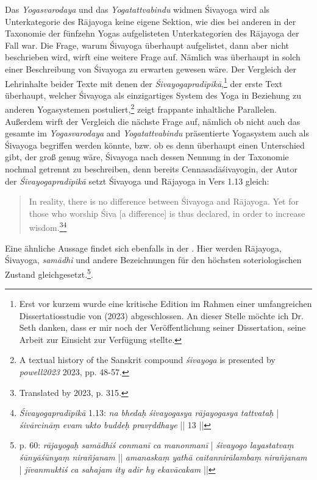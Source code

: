 Das \textit{Yogasvarodaya} und das \textit{Yogatattvabindu} widmen Śivayoga wird als Unterkategorie des Rājayoga keine eigene Sektion, wie dies bei anderen in der Taxonomie der fünfzehn Yogas aufgelisteten Unterkategorien des Rājayoga der Fall war. Die Frage, warum Śivayoga überhaupt aufgelistet, dann aber nicht beschrieben wird, wirft eine weitere Frage auf. Nämlich was überhaupt in solch einer Beschreibung von Śivayoga zu erwarten gewesen wäre. Der Vergleich der Lehrinhalte beider Texte mit denen der \textit{Śivayogapradīpikā},\footnote{Erst vor kurzem wurde eine kritische Edition im Rahmen einer umfangreichen Dissertatiosstudie von \citeauthor{powell2023} (2023) abgeschlossen. An dieser Stelle möchte ich Dr. Seth \citeauthor{powell2023} danken, dass er mir noch der Veröffentlichung seiner Dissertation, seine Arbeit zur Einsicht zur Verfügung stellte.} der erste Text überhaupt, welcher Śivayoga als einzigartiges System des Yoga in Beziehung zu anderen Yogasystemen postuliert,\footnote{A textual history of the Sanskrit compound \textit{śivayoga} is presented by \textit{powell2023} 2023, pp. 48-57.} zeigt frappante inhaltliche Parallelen. Außerdem wirft der Vergleich die nächste Frage auf, nämlich ob nicht auch das gesamte im \textit{Yogasvarodaya} and \textit{Yogatattvabindu} präsentierte Yogasystem auch als Śivayoga begriffen werden könnte, bzw. ob es denn überhaupt einen Unterschied gibt, der groß genug wäre, Śivayoga nach dessen Nennung in der Taxonomie nochmal getrennt zu beschreiben, denn bereits Cennasadāśivayogin, der Autor der \textit{Śivayogapradīpikā} setzt Śivayoga und Rājayoga in Vers 1.13 gleich:
\begin{quote}
In reality, there is no difference between Śivayoga and Rājayoga. Yet for those who worship Śiva [a difference] is thus declared, in order to increase wisdom.\footnote{Translated by \citeauthor{powell2023} 2023, p. 315.}\footnote{\textit{Śivayogapradīpikā} 1.13: \textit{na bhedaḥ śivayogasya rājayogasya tattvataḥ} | \textit{śivārcināṃ evam ukto buddeḥ pravṛddhaye} || 13 ||} 
\end{quote}
Eine ähnliche Aussage findet sich ebenfalls in der . Hier werden Rājayoga, Śivayoga, \textit{samādhi} und andere Bezeichnungen für den höchsten soteriologischen Zustand gleichgesetzt.\footnote{ p. 60: \textit{rājayogaḥ samādhiś conmanī ca manonmanī} | \textit{śivayogo layastatvaṃ śūnyāśūnyaṃ nirañjanam} || \textit{amanaskaṃ yathā caitannirālambaṃ nirañjanam} | \textit{jīvanmuktiś ca sahajam ity adir hy ekavācakam} ||}.

